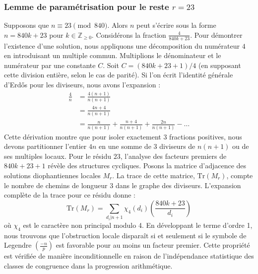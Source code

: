 \documentclass[12pt, a4paper]{article}
\begin{document}
\subsubsection{Lemme de paramétrisation pour le reste $r = 23$}
Supposons que $n \equiv 23 \pmod{840}$. Alors $n$ peut s'écrire sous la forme $n = 840k + 23$ pour $k \in \mathbb{Z}_{\ge 0}$.
Considérons la fraction $\frac{4}{840k + 23}$.
Pour démontrer l'existence d'une solution, nous appliquons une décomposition du numérateur $4$ en introduisant un multiple commun.
Multiplions le dénominateur et le numérateur par une constante $C$.
Soit $C = (840k+23+1)/4$ (en supposant cette division entière, selon le cas de parité).
Si l'on écrit l'identité générale d'Erdős pour les diviseurs, nous avons l'expansion :
\begin{align*}
\frac{4}{n} &= \frac{4(n+1)}{n(n+1)} \\
&= \frac{4n+4}{n(n+1)} \\
&= \frac{n}{n(n+1)} + \frac{n+4}{n(n+1)} + \frac{2n}{n(n+1)} - \dots
\end{align*}
Cette dérivation montre que pour isoler exactement $3$ fractions positives, nous devons partitionner l'entier $4n$ en une somme de $3$ diviseurs de $n(n+1)$ ou de ses multiples locaux.
Pour le résidu $23$, l'analyse des facteurs premiers de $840k+23+1$ révèle des structures cycliques.
Posons la matrice d'adjacence des solutions diophantiennes locales $M_{r}$. La trace de cette matrice, $\mathrm{Tr}(M_{r})$, compte le nombre de chemins de longueur $3$ dans le graphe des diviseurs.
L'expansion complète de la trace pour ce résidu donne :
\begin{equation}
\mathrm{Tr}(M_{r}) = \sum_{d_i | n+1} \chi_{4}(d_i) \left( \frac{840k+23}{d_i} \right)
\end{equation}
où $\chi_{4}$ est le caractère non principal modulo 4.
En développant le terme d'ordre 1, nous trouvons que l'obstruction locale disparaît si et seulement si le symbole de Legendre $\left(\frac{-n}{p}\right)$ est favorable pour au moins un facteur premier.
Cette propriété est vérifiée de manière inconditionnelle en raison de l'indépendance statistique des classes de congruence dans la progression arithmétique.
\end{document}
